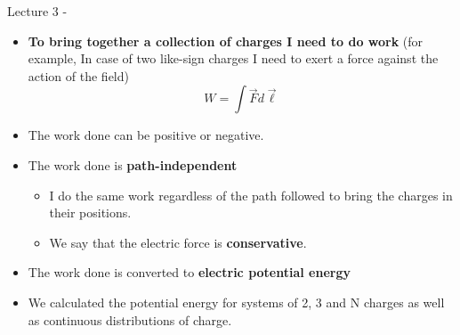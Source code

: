 
\renewcommand{\summarizedlecture}{3 }

%
%
%

\begin{frame}{Lecture \summarizedlecture - \lecturesummarytitle}

\begin{itemize}
\item {\bf To bring together a collection of charges I need to do work}
      (for example, In case of two like-sign charges I need to exert a force against the action of the field)
      \begin{equation*}
        W = \int \vec{F} d\vec{\ell}
      \end{equation*}
\item The work done can be positive or negative.
\item The work done is {\bf path-independent}
  \begin{itemize}
     \item I do the same work regardless of the path followed to bring the charges in their positions.
     \item We say that the electric force is {\bf conservative}.
  \end{itemize}
\item The work done is converted to {\bf electric potential energy}
\item We calculated the  potential energy for systems of 2, 3 and N charges as well as continuous distributions of charge.

\end{itemize}

\end{frame}

%
%
%

